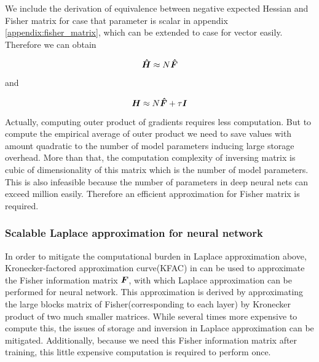 We include the derivation of equivalence between negative expected Hessian and Fisher matrix for case that parameter is scalar in appendix \ref{appendix:fisher_matrix}, which can be extended to case for vector easily.
Therefore we can obtain 

\begin{equation} \label{fisher hessian}
\boldsymbol{\hat{H}} \approx N\boldsymbol{\hat{F}}
\end{equation}

and

\begin{equation} \label{fisher hessian_with_prior}
\boldsymbol H \approx N\boldsymbol{\hat F} + \tau \mathcal {\boldsymbol I}
\end{equation}

Actually, computing outer product of gradients requires less computation. But to compute the empirical average of outer product we need to save values with amount quadratic to the number of model parameters inducing large storage overhead. More than that, the computation complexity of inversing matrix is cubic of dimensionality of this matrix which is the number of model parameters. This is also infeasible because the number of parameters in deep neural nets can exceed million easily. Therefore an efficient approximation for Fisher matrix is required. 


\subsubsection{Scalable Laplace approximation for neural network}
In order to mitigate the computational burden in Laplace approximation above, Kronecker-factored approximation curve(KFAC) in \cite{martens2015optimizing} can be used to approximate the Fisher information matrix $\boldsymbol F$, with which Laplace approximation can be performed for neural network\cite{ritter2018scalable}. This approximation is derived by approximating the large blocks matrix of Fisher(corresponding to each layer) by Kronecker product of two much smaller matrices. While several times more expensive to compute this, the issues of storage and inversion in Laplace approximation can be mitigated. Additionally, because we need this Fisher information matrix after training, this little expensive computation is required to perform once.

